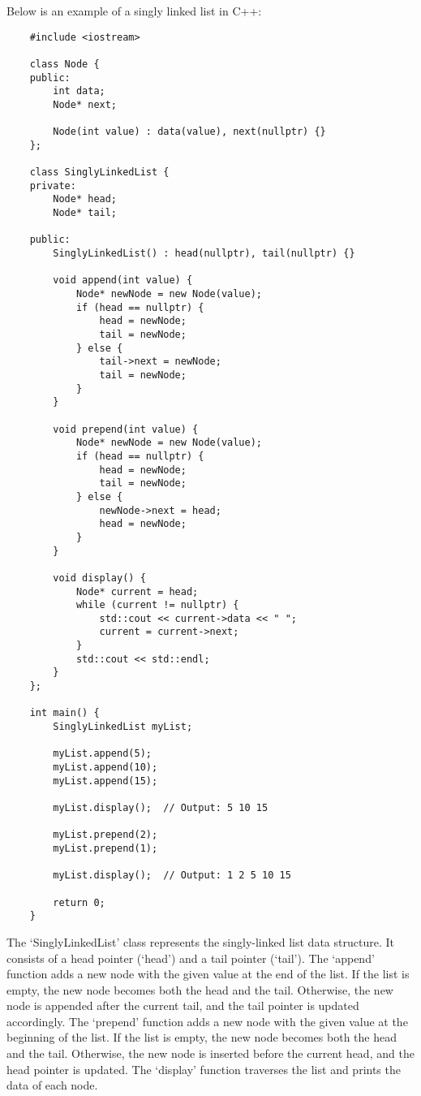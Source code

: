 \begin{solution}
    Below is an example of a singly linked list in C++:

    \horizontalline
    
    \begin{verbatim}
    #include <iostream>

    class Node {
    public:
        int data;
        Node* next;
    
        Node(int value) : data(value), next(nullptr) {}
    };
    
    class SinglyLinkedList {
    private:
        Node* head;
        Node* tail;
    
    public:
        SinglyLinkedList() : head(nullptr), tail(nullptr) {}
    
        void append(int value) {
            Node* newNode = new Node(value);
            if (head == nullptr) {
                head = newNode;
                tail = newNode;
            } else {
                tail->next = newNode;
                tail = newNode;
            }
        }
    
        void prepend(int value) {
            Node* newNode = new Node(value);
            if (head == nullptr) {
                head = newNode;
                tail = newNode;
            } else {
                newNode->next = head;
                head = newNode;
            }
        }
    
        void display() {
            Node* current = head;
            while (current != nullptr) {
                std::cout << current->data << " ";
                current = current->next;
            }
            std::cout << std::endl;
        }
    };
    
    int main() {
        SinglyLinkedList myList;
    
        myList.append(5);
        myList.append(10);
        myList.append(15);
    
        myList.display();  // Output: 5 10 15
    
        myList.prepend(2);
        myList.prepend(1);
    
        myList.display();  // Output: 1 2 5 10 15
    
        return 0;
    }
    \end{verbatim}

    \horizontalline

    The `SinglyLinkedList' class represents the singly-linked list data structure. It consists of a head pointer (`head') and a tail pointer (`tail'). The `append' function adds a new node with the given value at the end of the list. 
    If the list is empty, the new node becomes both the head and the tail. Otherwise, the new node is appended after the current tail, and the tail pointer is updated accordingly. The `prepend' function adds a new node with the given 
    value at the beginning of the list. If the list is empty, the new node becomes both the head and the tail. Otherwise, the new node is inserted before the current head, and the head pointer is updated. The `display' function traverses 
    the list and prints the data of each node.


\end{solution}
